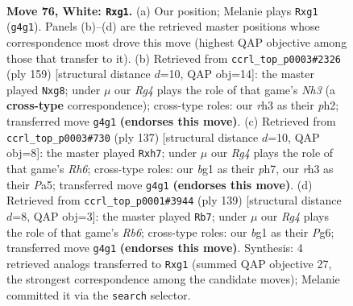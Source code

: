 \documentclass[11pt]{article}
\begin{document}
\clearpage

\begin{figure}[p]\centering
\begin{subfigure}{0.46\textwidth}\centering
\resizebox{\linewidth}{!}{%
\newchessgame
\chessboard[
  setfen={8/8/3kn3/P7/6R1/7r/2K5/6b1 w - - 0 76},
  showmover=false,
  pgfstyle=straightmove, color=movearrow, markmove={g4-g1}
]}
\caption{}
\end{subfigure}\hfill
\begin{subfigure}{0.46\textwidth}\centering
\resizebox{\linewidth}{!}{%
\newchessgame
\chessboard[
  setfen={6B1/8/7n/8/4k3/2K5/2N4P/8 b - - 0 80},
  showmover=false,
  pgfstyle=straightmove, color=movearrow, markmove={h6-g8}
]}
\caption{}
\end{subfigure}
\\[4pt]
\begin{subfigure}{0.46\textwidth}\centering
\resizebox{\linewidth}{!}{%
\newchessgame
\chessboard[
  setfen={8/1k5P/6K1/p4N2/8/7r/8/8 b - - 2 69},
  showmover=false,
  pgfstyle=straightmove, color=movearrow, markmove={h3-h7}
]}
\caption{}
\end{subfigure}\hfill
\begin{subfigure}{0.46\textwidth}\centering
\resizebox{\linewidth}{!}{%
\newchessgame
\chessboard[
  setfen={R7/8/6p1/3N4/4K1k1/1r6/8/8 b - - 7 70},
  showmover=false,
  pgfstyle=straightmove, color=movearrow, markmove={b3-b7}
]}
\caption{}
\end{subfigure}
\caption{\textbf{Move 76, White: \texttt{Rxg1}.} (a) Our position; Melanie plays \texttt{Rxg1} (\texttt{g4g1}). Panels (b)--(d) are the retrieved master positions whose correspondence most drove this move (highest QAP objective among those that transfer to it). (b) Retrieved from \texttt{ccrl\_top\_p0003\#2326} (ply 159) [structural distance $d$=10, QAP obj=14]: the master played \texttt{Nxg8}; under $\mu$ our \emph{Rg4} plays the role of that game's \emph{Nh3} (a \textbf{cross-type} correspondence); cross-type roles: our \emph{r}h3 as their \emph{p}h2; transferred move \texttt{g4g1} \textbf{(endorses this move)}. (c) Retrieved from \texttt{ccrl\_top\_p0003\#730} (ply 137) [structural distance $d$=10, QAP obj=8]: the master played \texttt{Rxh7}; under $\mu$ our \emph{Rg4} plays the role of that game's \emph{Rh6}; cross-type roles: our \emph{b}g1 as their \emph{p}h7, our \emph{r}h3 as their \emph{P}a5; transferred move \texttt{g4g1} \textbf{(endorses this move)}. (d) Retrieved from \texttt{ccrl\_top\_p0001\#3944} (ply 139) [structural distance $d$=8, QAP obj=3]: the master played \texttt{Rb7}; under $\mu$ our \emph{Rg4} plays the role of that game's \emph{Rb6}; cross-type roles: our \emph{b}g1 as their \emph{P}g6; transferred move \texttt{g4g1} \textbf{(endorses this move)}. Synthesis: 4 retrieved analogs transferred to \texttt{Rxg1} (summed QAP objective 27, the strongest correspondence among the candidate moves); Melanie committed it via the \texttt{search} selector.}
\label{fig:thought-m150}
\end{figure}
\end{document}
